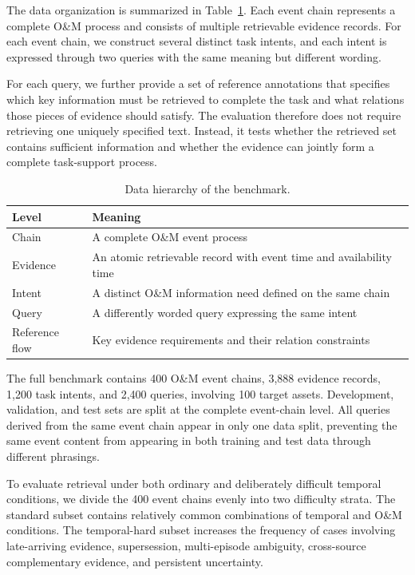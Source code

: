 The data organization is summarized in Table~\ref{tab:dataset_structure}. Each event chain represents a complete O\&M process and consists of multiple retrievable evidence records. For each event chain, we construct several distinct task intents, and each intent is expressed through two queries with the same meaning but different wording.

For each query, we further provide a set of reference annotations that specifies which key information must be retrieved to complete the task and what relations those pieces of evidence should satisfy. The evaluation therefore does not require retrieving one uniquely specified text. Instead, it tests whether the retrieved set contains sufficient information and whether the evidence can jointly form a complete task-support process.

\begin{table}[t]
\caption{Data hierarchy of the benchmark.}
\label{tab:dataset_structure}
\centering
\small
\begin{tabular}{@{}p{}p{}@{}}
\toprule
Level & Meaning \\
\midrule
Chain & A complete O\&M event process \\
Evidence & An atomic retrievable record with event time and availability time \\
Intent & A distinct O\&M information need defined on the same chain \\
Query & A differently worded query expressing the same intent \\
Reference flow & Key evidence requirements and their relation constraints \\
\bottomrule
\end{tabular}
\end{table}

The full benchmark contains 400 O\&M event chains, 3,888 evidence records, 1,200 task intents, and 2,400 queries, involving 100 target assets. Development, validation, and test sets are split at the complete event-chain level. All queries derived from the same event chain appear in only one data split, preventing the same event content from appearing in both training and test data through different phrasings.

To evaluate retrieval under both ordinary and deliberately difficult temporal conditions, we divide the 400 event chains evenly into two difficulty strata. The standard subset contains relatively common combinations of temporal and O\&M conditions. The temporal-hard subset increases the frequency of cases involving late-arriving evidence, supersession, multi-episode ambiguity, cross-source complementary evidence, and persistent uncertainty.

